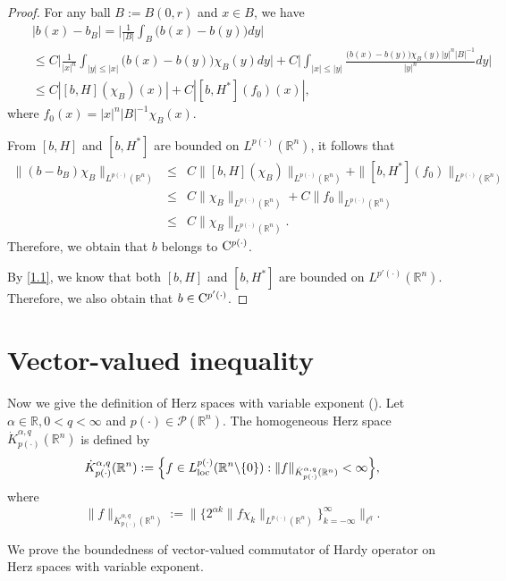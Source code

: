 \documentclass{amse-new}
\numberwithin{equation}{section} %
\begin{document}
\begin{proof}
For any ball $B:=B(0,r)$ and $x\in B$, we have
\begin{eqnarray*}
&&|b(x)-b_{B}|=\Big|\frac{1}{|B|}\int_{B}\big(b(x)-b(y)\big)dy\Big|\\
&&\leq C\Big|\frac{1}{|x|^{n}}\int_{|y|\leq |x|}\big(b(x)-b(y)\big)\chi_{B}(y)dy\Big|
+C\Big|\int_{|x|\leq |y|}\frac{\big(b(x)-b(y)\big)\chi_{B}(y)|y|^{n}|B|^{-1}}{|y|^{n}}dy\Big|\\
&&\leq C|[b,H](\chi_{B})(x)|+C|[b,H^{*}](f_{0})(x)|,
\end{eqnarray*}
where $f_{0}(x)=|x|^{n}|B|^{-1}\chi_{B}(x)$.

From $[b,H]$ and $[b,H^{*}]$ are bounded on $L^{p(\cdot)}(\mathbb{R}^n)$, it follows that
\begin{eqnarray*}
\|(b-b_{B})\chi_{B}\|_{L^{p(\cdot)}(\mathbb{R}^n)}
&\leq&C\|[b,H](\chi_{B})\|_{L^{p(\cdot)}(\mathbb{R}^n)}+\|[b,H^{*}](f_{0})\|_{L^{p(\cdot)}(\mathbb{R}^n)}\\
&\leq& C\|\chi_{B}\|_{L^{p(\cdot)}(\mathbb{R}^n)}+C\|f_{0}\|_{L^{p(\cdot)}(\mathbb{R}^n)}\\
&\leq& C\|\chi_{B}\|_{L^{p(\cdot)}(\mathbb{R}^n)}.
\end{eqnarray*}
Therefore, we obtain that $b$ belongs to ${\rm C}^{p(\cdot)}$.

By \eqref{1.1}, we know that both $[b,H]$ and $[b,H^{*}]$ are bounded on $L^{p'(\cdot)}(\mathbb{R}^n)$. Therefore, we also obtain that $b\in {\rm C}^{p'(\cdot)}$.
\end{proof}


\section{Vector-valued inequality}

Now we give the definition of Herz spaces with variable exponent (\cite{I}). Let $\alpha\in \mathbb{R}, 0<q<\infty$ and $p(\cdot)\in \mathcal{P}(\mathbb{R}^n)$. The homogeneous Herz space $\dot{K}^{\alpha,q}_{p(\cdot)}(\mathbb{R}^n)$ is defined by
$$\dot{K}^{\alpha,q}_{p(\cdot)}(\mathbb{R}^n):=\Big\{f\in L^{p(\cdot)}_{\rm loc}(\mathbb{R}^n\backslash \{0\}):\|f\|_{\dot{K}^{\alpha,q}_{p(\cdot)}(\mathbb{R}^n)}<\infty\Big\},$$
where
$$\|f\|_{\dot{K}^{\alpha,q}_{p(\cdot)}(\mathbb{R}^n)}:=\Big\|\Big\{2^{\alpha k}\|f\chi_{k}\|_{L^{p(\cdot)}(\mathbb{R}^n)}\Big\}_{k=-\infty}^{\infty}\Big\|_{\ell^{q}}.$$

We prove the boundedness of vector-valued commutator of Hardy operator on Herz spaces with variable exponent.
\end{document}
